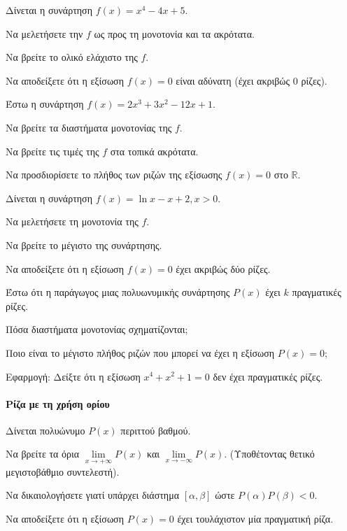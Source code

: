 \documentclass[11pt,a4paper,modern]{FFExercises}
\begin{document}
\askhsh
Δίνεται η συνάρτηση $f(x)=x^4-4x+5$.
\begin{alist}
    \item Να μελετήσετε την $f$ ως προς τη μονοτονία και τα ακρότατα.
    \item Να βρείτε το ολικό ελάχιστο της $f$.
    \item Να αποδείξετε ότι η εξίσωση $f(x)=0$ είναι αδύνατη (έχει ακριβώς 0 ρίζες).
\end{alist}

\askhsh
Έστω η συνάρτηση $f(x)=2x^3+3x^2-12x+1$.
\begin{alist}
    \item Να βρείτε τα διαστήματα μονοτονίας της $f$.
    \item Να βρείτε τις τιμές της $f$ στα τοπικά ακρότατα.
    \item Να προσδιορίσετε το πλήθος των ριζών της εξίσωσης $f(x)=0$ στο $\mathbb{R}$.
\end{alist}

\askhsh
Δίνεται η συνάρτηση $f(x)=\ln x - x + 2, x>0$.
\begin{alist}
    \item Να μελετήσετε τη μονοτονία της $f$.
    \item Να βρείτε το μέγιστο της συνάρτησης.
    \item Να αποδείξετε ότι η εξίσωση $f(x)=0$ έχει ακριβώς δύο ρίζες.
\end{alist}

\askhsh
Έστω ότι η παράγωγος μιας πολυωνυμικής συνάρτησης $P(x)$ έχει $k$ πραγματικές ρίζες.
\begin{alist}
    \item Πόσα διαστήματα μονοτονίας σχηματίζονται;
    \item Ποιο είναι το μέγιστο πλήθος ριζών που μπορεί να έχει η εξίσωση $P(x)=0$;
    \item Εφαρμογή: Δείξτε ότι η εξίσωση $x^4+x^2+1=0$ δεν έχει πραγματικές ρίζες.
\end{alist}
\paragraph{Ρίζα με τη χρήση ορίου}
\askhsh
Δίνεται πολυώνυμο $P(x)$ περιττού βαθμού.
\begin{alist}
    \item Να βρείτε τα όρια $\lim\limits_{x\to +\infty}P(x)$ και $\lim\limits_{x\to -\infty}P(x)$. (Υποθέτοντας θετικό μεγιστοβάθμιο συντελεστή).
    \item Να δικαιολογήσετε γιατί υπάρχει διάστημα $[\alpha, \beta]$ ώστε $P(\alpha)P(\beta)<0$.
    \item Να αποδείξετε ότι η εξίσωση $P(x)=0$ έχει τουλάχιστον μία πραγματική ρίζα.
\end{alist}
\end{document}
